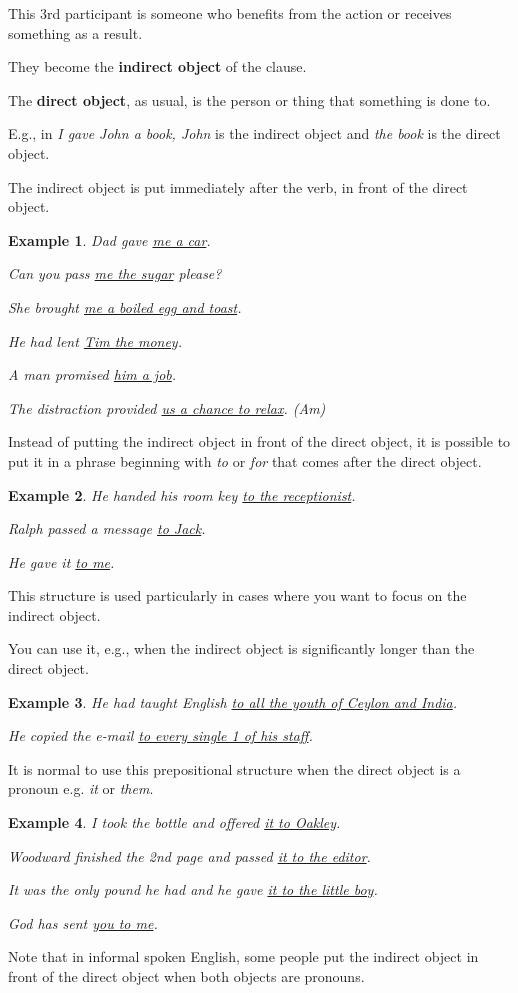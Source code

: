 \documentclass[oneside]{book}
\numberwithin{equation}{section}
\newtheorem{example}{Example}[section]
\begin{document}
This 3rd participant is someone who benefits from the action or receives something as a result.

They become the \textbf{indirect object} of the clause.

The \textbf{direct object}, as usual, is the person or thing that something is done to.

E.g., in \textit{I gave John a book, John} is the indirect object and \textit{the book} is the direct object.

%
The indirect object is put immediately after the verb, in front of the direct object.
\begin{example}
    Dad gave \underline{me a car}.
    
    Can you pass \underline{me the sugar} please?
    
    She brought \underline{me a boiled egg and toast}.
    
    He had lent \underline{Tim the money}.
    
    A man promised \underline{him a job}.
    
    The distraction provided \underline{us a chance to relax}. (Am)
\end{example}
%
\noindent{} Instead of putting the indirect object in front of the direct object, it is possible to put it in a phrase beginning with \textit{to} or \textit{for} that comes after the direct object.
\begin{example}
    He handed his room key \underline{to the receptionist}.
    
    Ralph passed a message \underline{to Jack}.
    
    He gave it \underline{to me}.
\end{example}
This structure is used particularly in cases where you want to focus on the indirect object.

You can use it, e.g., when the indirect object is significantly longer than the direct object.
\begin{example}
    He had taught English \underline{to all the youth of Ceylon and India}.
    
    He copied the e-mail \underline{to every single 1 of his staff}.
\end{example}
%
\noindent{} It is normal to use this prepositional structure when the direct object is a pronoun e.g. \textit{it} or \textit{them}.
\begin{example}
    I took the bottle and offered \underline{it to Oakley}.
    
    Woodward finished the 2nd page and passed \underline{it to the editor}.
    
    It was the only pound he had and he gave \underline{it to the little boy}.
    
    God has sent \underline{you to me}.
\end{example}
Note that in informal spoken English, some people put the indirect object in front of the direct object when both objects are pronouns.
\end{document}
